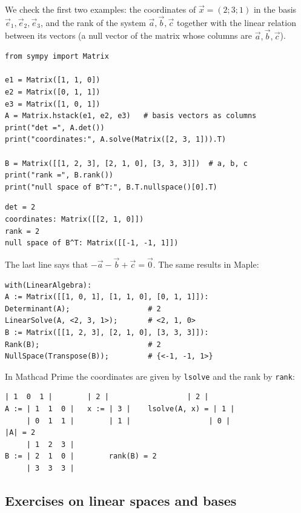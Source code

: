 We check the first two examples: the coordinates of $\vec x=(2;3;1)$ in the
basis $\vec e_1,\vec e_2,\vec e_3$, and the rank of the system
$\vec a,\vec b,\vec c$ together with the linear relation between its vectors
(a null vector of the matrix whose columns are $\vec a,\vec b,\vec c$).
\begin{Verbatim}[fontsize=\footnotesize,frame=single,label={\small Python}]
from sympy import Matrix

e1 = Matrix([1, 1, 0])
e2 = Matrix([0, 1, 1])
e3 = Matrix([1, 0, 1])
A = Matrix.hstack(e1, e2, e3)   # basis vectors as columns
print("det =", A.det())
print("coordinates:", A.solve(Matrix([2, 3, 1])).T)

B = Matrix([[1, 2, 3], [2, 1, 0], [3, 3, 3]])  # a, b, c
print("rank =", B.rank())
print("null space of B^T:", B.T.nullspace()[0].T)
\end{Verbatim}
\begin{Verbatim}[fontsize=\footnotesize,frame=single,label={\small Output}]
det = 2
coordinates: Matrix([[2, 1, 0]])
rank = 2
null space of B^T: Matrix([[-1, -1, 1]])
\end{Verbatim}
The last line says that $-\vec a-\vec b+\vec c=\vec 0$. The same results in
Maple:
\begin{Verbatim}[fontsize=\footnotesize,frame=single,label={\small Maple}]
with(LinearAlgebra):
A := Matrix([[1, 0, 1], [1, 1, 0], [0, 1, 1]]):
Determinant(A);                  # 2
LinearSolve(A, <2, 3, 1>);       # <2, 1, 0>
B := Matrix([[1, 2, 3], [2, 1, 0], [3, 3, 3]]):
Rank(B);                         # 2
NullSpace(Transpose(B));         # {<-1, -1, 1>}
\end{Verbatim}
In Mathcad Prime the coordinates are given by \texttt{lsolve} and the rank
by \texttt{rank}:
\begin{Verbatim}[fontsize=\footnotesize,frame=single,label={\small Mathcad}]
     | 1  0  1 |        | 2 |                  | 2 |
A := | 1  1  0 |   x := | 3 |    lsolve(A, x) = | 1 |
     | 0  1  1 |        | 1 |                  | 0 |
|A| = 2
     | 1  2  3 |
B := | 2  1  0 |        rank(B) = 2
     | 3  3  3 |
\end{Verbatim}

\subsection{Exercises on linear spaces and bases}

